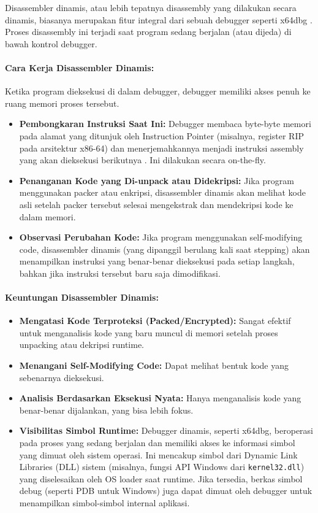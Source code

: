 Disassembler dinamis, atau lebih tepatnya disassembly yang dilakukan secara dinamis, biasanya merupakan fitur integral dari sebuah debugger seperti x64dbg \cite{Dun14}. Proses disassembly ini terjadi saat program sedang berjalan (atau dijeda) di bawah kontrol debugger.

\paragraph{Cara Kerja Disassembler Dinamis:}
Ketika program dieksekusi di dalam debugger, debugger memiliki akses penuh ke ruang memori proses tersebut.
\begin{itemize}
\item \textbf{Pembongkaran Instruksi Saat Ini:} Debugger membaca byte-byte memori pada alamat yang ditunjuk oleh Instruction Pointer (misalnya, register RIP pada arsitektur x86-64) dan menerjemahkannya menjadi instruksi assembly yang akan dieksekusi berikutnya \cite{Sikorski2012}. Ini dilakukan secara on-the-fly.
\item \textbf{Penanganan Kode yang Di-unpack atau Didekripsi:} Jika program menggunakan packer atau enkripsi, disassembler dinamis akan melihat kode asli setelah packer tersebut selesai mengekstrak dan mendekripsi kode ke dalam memori.
\item \textbf{Observasi Perubahan Kode:} Jika program menggunakan self-modifying code, disassembler dinamis (yang dipanggil berulang kali saat stepping) akan menampilkan instruksi yang benar-benar dieksekusi pada setiap langkah, bahkan jika instruksi tersebut baru saja dimodifikasi.
\end{itemize}

\paragraph{Keuntungan Disassembler Dinamis:}
\begin{itemize}
\item \textbf{Mengatasi Kode Terproteksi (Packed/Encrypted):} Sangat efektif untuk menganalisis kode yang baru muncul di memori setelah proses unpacking atau dekripsi runtime.
\item \textbf{Menangani Self-Modifying Code:} Dapat melihat bentuk kode yang sebenarnya dieksekusi.
\item \textbf{Analisis Berdasarkan Eksekusi Nyata:} Hanya menganalisis kode yang benar-benar dijalankan, yang bisa lebih fokus.
\item \textbf{Visibilitas Simbol Runtime:} Debugger dinamis, seperti x64dbg, beroperasi pada proses yang sedang berjalan dan memiliki akses ke informasi simbol yang dimuat oleh sistem operasi. Ini mencakup simbol dari Dynamic Link Libraries (DLL) sistem (misalnya, fungsi API Windows dari \texttt{kernel32.dll}) yang diselesaikan oleh OS loader saat runtime. Jika tersedia, berkas simbol debug (seperti PDB untuk Windows) juga dapat dimuat oleh debugger untuk menampilkan simbol-simbol internal aplikasi.
\end{itemize}

